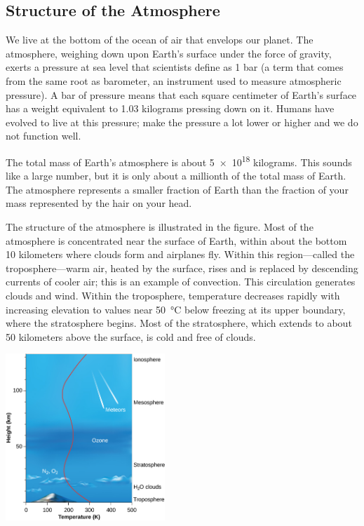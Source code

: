 \documentclass{article}
\numberwithin{equation}{section}
\numberwithin{figure}{section}
\begin{document}
\subsection{Structure of the Atmosphere} \label{Qhjd2y}

We live at the bottom of the ocean of air that envelops our planet. The atmosphere, weighing down upon Earth's surface under the force of gravity, exerts a pressure at sea level that scientists define as 1 bar (a term that comes from the same root as barometer, an instrument used to measure atmospheric pressure). A bar of pressure means that each square centimeter of Earth's surface has a weight equivalent to 1.03 kilograms pressing down on it. Humans have evolved to live at this pressure; make the pressure a lot lower or higher and we do not function well.

\vspace{1em}

The total mass of Earth's atmosphere is about \SI{5e18}{} kilograms. This sounds like a large number, but it is only about a millionth of the total mass of Earth. The atmosphere represents a smaller fraction of Earth than the fraction of your mass represented by the hair on your head.

\vspace{1em}

\begin{minipage}{0.5\textwidth}
    The structure of the atmosphere is illustrated in the figure. Most of the atmosphere is concentrated near the surface of Earth, within about the bottom 10 kilometers where clouds form and airplanes fly. Within this region---called the troposphere---warm air, heated by the surface, rises and is replaced by descending currents of cooler air; this is an example of convection. This circulation generates clouds and wind. Within the troposphere, temperature decreases rapidly with increasing elevation to values near \qty{50}{\degreeCelsius} below freezing at its upper boundary, where the stratosphere begins. Most of the stratosphere, which extends to about 50 kilometers above the surface, is cold and free of clouds.
\end{minipage}%
\hspace{10mm}
\begin{minipage}{0.45\textwidth}
    \includegraphics[width=6cm]{Figures/Figure8.12.jpeg}
\end{minipage}
\end{document}
